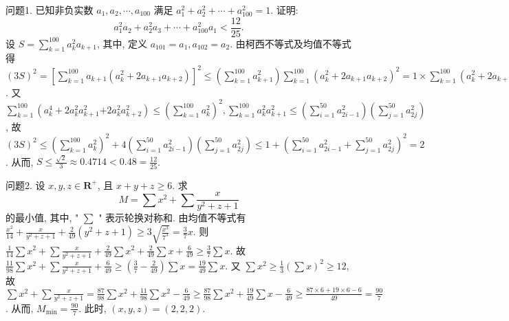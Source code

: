 
问题1. 已知非负实数 $a_1, a_2, \cdots, a_{100}$ 满足 $a_1^2+a_2^2+\cdots+a_{100}^2=1$. 证明:
$$
a_1^2 a_2+a_2^2 a_3+\cdots+a_{100}^2 a_1<\frac{12}{25} .
$$
设 $S=\sum_{k=1}^{100} a_k^2 a_{k+1}$, 其中, 定义 $a_{101}=a_1, a_{102}=a_2$. 由柯西不等式及均值不等式得 $(3 S)^2=\left[\sum_{k=1}^{100} a_{k+1}\left(a_k^2+2 a_{k+1} a_{k+2}\right)\right]^2 \leqslant\left(\sum_{k=1}^{100} a_{k+1}^2\right) \sum_{k=1}^{100}\left(a_k^2+2 a_{k+1} a_{k+2}\right)^2 =1 \times \sum_{k=1}^{100}\left(a_k^2+2 a_{k+1} a_{k+2}\right)^2=\sum_{k=1}^{100}\left(a_k^4+4 a_k^2 a_{k+1} a_{k+2}+4 a_{k+1}^2 a_{k+2}^2\right) \leqslant \sum_{k=1}^{100}\left[a_k^4+\right. \left.2 a_k^2\left(a_{k+1}^2+a_{k+2}^2\right)+4 a_{k+1}^2 a_{k+2}^2\right]=\sum_{k=1}^{100}\left(a_k^4+6 a_k^2 a_{k+1}^2+2 a_k^2 a_{k+2}^2\right)$. 又 $\sum_{k=1}^{100}\left(a_k^4+2 a_k^2 a_{k+1}^2\right. \left.+2 a_k^2 a_{k+2}^2\right) \leqslant\left(\sum_{k=1}^{100} a_k^2\right)^2, \sum_{k=1}^{100} a_k^2 a_{k+1}^2 \leqslant\left(\sum_{i=1}^{50} a_{2 i-1}^2\right)\left(\sum_{j=1}^{50} a_{2 j}^2\right)$, 故 $(3 S)^2 \leqslant\left(\sum_{k=1}^{100} a_k^2\right)^2+ 4\left(\sum_{i=1}^{50} a_{2 i-1}^2\right)\left(\sum_{j=1}^{50} a_{2 j}^2\right) \leqslant 1+\left(\sum_{i=1}^{50} a_{2 i-1}^2+\sum_{j=1}^{50} a_{2 j}^2\right)^2=2$. 从而, $S \leqslant \frac{\sqrt{2}}{3} \approx 0.4714< 0.48=\frac{12}{25}$. 



问题2. 设 $x, y, z \in \mathbf{R}^{+}$, 且 $x+y+z \geqslant 6$. 求
$$
M=\sum x^2+\sum \frac{x}{y^2+z+1}
$$
的最小值, 其中, " $\sum$ " 表示轮换对称和.
由均值不等式有 ${\frac{x^{2}}{14}}+{\frac{x}{y^{2}+z+1}}+{\frac{2}{49}}(y^{2}+z+1)\geq3{\sqrt{{\frac{x^{3}}{7^{3}}}}}={\frac{3}{7}}x$. 则 $\frac{1}{14} \sum x^2+\sum \frac{x}{y^2+z+1}+\frac{2}{49} \sum x^2+\frac{2}{49} \sum x+\frac{6}{49} \geqslant \frac{3}{7} \sum x$. 故 $\frac{11}{98} \sum x^2+\sum \frac{x}{y^2+z+1}+\frac{6}{49} \geqslant\left(\frac{3}{7}-\frac{2}{49}\right) \sum x=\frac{19}{49} \sum x$. 又 $\sum x^2 \geqslant \frac{1}{3}\left(\sum x\right)^2 \geqslant 12$, 故 $\sum x^2+\sum \frac{x}{y^2+z+1}=\frac{87}{98} \sum x^2+\frac{11}{98} \sum x^2-\frac{6}{49} \geqslant \frac{87}{98} \sum x^2+\frac{19}{49} \sum x-\frac{6}{49} \geqslant \frac{87 \times 6+19 \times 6-6}{49}=\frac{90}{7}$. 从而, $M_{\min }=\frac{90}{7}$. 此时, $(x, y, z)=(2,2,2)$.



